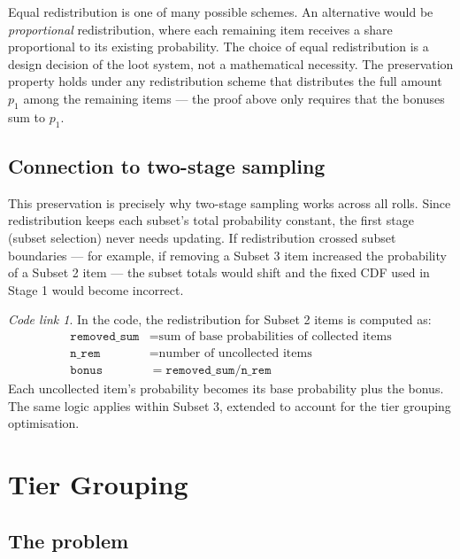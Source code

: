 \documentclass[11pt,a4paper]{article}
\theoremstyle{remark}
\newtheorem*{codelink}{Code link}
\begin{document}
Equal redistribution is one of many possible schemes. An alternative would be \emph{proportional} redistribution, where each remaining item receives a share proportional to its existing probability. The choice of equal redistribution is a design decision of the loot system, not a mathematical necessity. The preservation property holds under any redistribution scheme that distributes the full amount $p_1$ among the remaining items --- the proof above only requires that the bonuses sum to $p_1$.

\subsection{Connection to two-stage sampling}

This preservation is precisely why two-stage sampling works across all rolls. Since redistribution keeps each subset's total probability constant, the first stage (subset selection) never needs updating. If redistribution crossed subset boundaries --- for example, if removing a Subset 3 item increased the probability of a Subset 2 item --- the subset totals would shift and the fixed CDF used in Stage 1 would become incorrect.

\begin{codelink}
In the code, the redistribution for Subset 2 items is computed as:
\begin{align*}
\texttt{removed\_sum} &= \text{sum of base probabilities of collected items} \\
\texttt{n\_rem} &= \text{number of uncollected items} \\
\texttt{bonus} &= \texttt{removed\_sum} / \texttt{n\_rem}
\end{align*}
Each uncollected item's probability becomes its base probability plus the bonus. The same logic applies within Subset 3, extended to account for the tier grouping optimisation.
\end{codelink}

\section{Tier Grouping}

\subsection{The problem}
\end{document}
